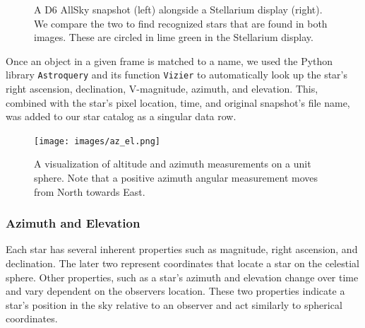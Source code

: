 \begin{figure}[h]
  \caption{A D6 AllSky snapshot (left) alongside a Stellarium display (right).  We compare the two to find recognized stars that are found in both images.  These are circled in lime green in the Stellarium display. }
  \label{star_recognition}
\end{figure}


Once an object in a given frame is matched to a name, we used the Python library \texttt{Astroquery} and its function \texttt{Vizier} to automatically look up the star's right ascension, declination, V-magnitude, azimuth, and elevation.  
This, combined with the star's pixel location, time, and original snapshot's file name, was added to our star catalog as a singular data row.

\begin{figure}[h]
  \centering
  \texttt{[image: images/az\_el.png]}
  \caption{A visualization of altitude and azimuth measurements on a unit sphere.  Note that a positive azimuth angular measurement moves from North towards East.}
  \label{altaz}
\end{figure}

\subsubsection{Azimuth and Elevation}

Each star has several inherent properties such as magnitude, right ascension, and declination.  
The later two represent coordinates that locate a star on the celestial sphere.  
Other properties, such as a star's azimuth and elevation change over time and vary dependent on the observers location.  
These two properties indicate a star's position in the sky relative to an observer and act similarly to spherical coordinates.

